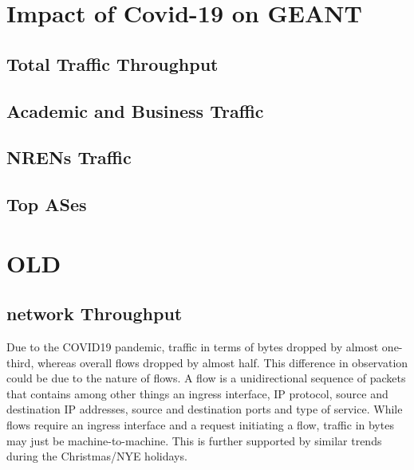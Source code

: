 \documentclass[10pt, journal, letterpaper]{IEEEtran}
\begin{document}
\section{Impact of Covid-19 on GEANT}

\subsection{Total Traffic Throughput}

\subsection{Academic and Business Traffic}

\subsection{NRENs Traffic}

\subsection{Top ASes}


\section{OLD}
\subsection{network Throughput}

Due to the COVID19 pandemic, traffic in terms of bytes dropped by almost one-third, whereas overall flows dropped by almost half. This difference in observation could be due to the nature of flows. A flow is a unidirectional sequence of packets that contains among other things an ingress interface, IP protocol, source and destination IP addresses, source and destination ports and type of service. While flows require an ingress interface and a request initiating a flow, traffic in bytes may just be machine-to-machine. This is further supported by similar trends during the Christmas/NYE holidays.
\end{document}
